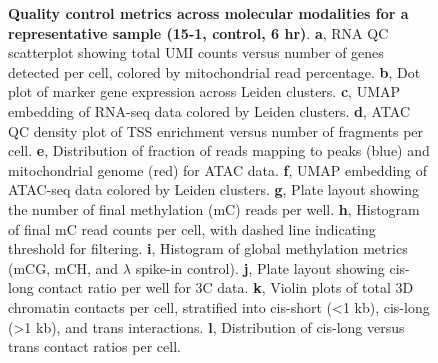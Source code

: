 \begin{figure}[p]
    \caption[Quality control across molecular modalities]{\textbf{Quality control metrics across molecular modalities for a representative sample (15-1, control, 6 hr)}. \textbf{a}, RNA QC scatterplot showing total UMI counts versus number of genes detected per cell, colored by mitochondrial read percentage. \textbf{b}, Dot plot of marker gene expression across Leiden clusters. \textbf{c}, UMAP embedding of RNA-seq data colored by Leiden clusters. \textbf{d}, ATAC QC density plot of TSS enrichment versus number of fragments per cell. \textbf{e}, Distribution of fraction of reads mapping to peaks (blue) and mitochondrial genome (red) for ATAC data. \textbf{f}, UMAP embedding of ATAC-seq data colored by Leiden clusters. \textbf{g}, Plate layout showing the number of final methylation (mC) reads per well. \textbf{h}, Histogram of final mC read counts per cell, with dashed line indicating threshold for filtering. \textbf{i}, Histogram of global methylation metrics (mCG, mCH, and $\lambda$ spike-in control). \textbf{j}, Plate layout showing cis-long contact ratio per well for 3C data. \textbf{k}, Violin plots of total 3D chromatin contacts per cell, stratified into cis-short (<1 kb), cis-long (>1 kb), and trans interactions. \textbf{l}, Distribution of cis-long versus trans contact ratios per cell.}
    \label{fig:3 supplementary_1}
\end{figure}

